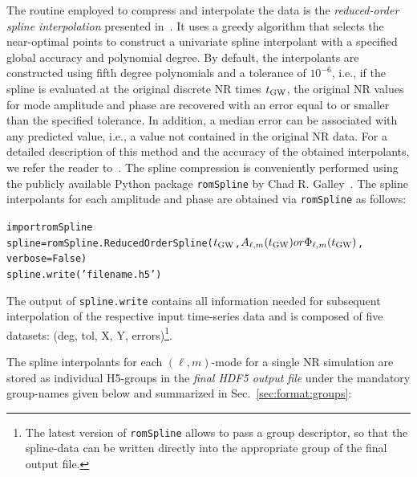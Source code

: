 \documentclass[11pt,tightenlines,article,amssymb,amsmath,amsfonts,superscriptaddress,nofootinbib]{revtex4}
\newcommand{\tGW}{t_{\rm GW}}
\begin{document}
The routine employed to compress and interpolate the data is the \emph{reduced-order spline interpolation} presented in~\cite{Galley:2016mvy}. It uses a greedy algorithm that selects the near-optimal points to construct a univariate spline interpolant with a specified global accuracy and polynomial degree.
By default, the interpolants are constructed using fifth degree polynomials and a tolerance of $10^{-6}$,
i.e., if the spline is evaluated at the original discrete NR times $\tGW$, the original NR values for mode amplitude and phase are recovered with an error equal to or smaller than the specified tolerance. In addition, a median error can be associated with any predicted value, i.e., a value not contained in the original NR data. 
For a detailed description of this method and the accuracy of the obtained interpolants, we refer the reader to~\cite{Galley:2016mvy}. The spline compression is conveniently performed using the publicly available Python package \texttt{romSpline} by Chad R. Galley~\cite{romspline}. The spline interpolants for each amplitude and phase are obtained via \verb"romSpline" as follows: 
\begin{alltt}
import romSpline 
spline = romSpline.ReducedOrderSpline(\(\tGW\), \(A\sb{\ell,m}(\tGW) or \Phi\sb{\ell,m}(\tGW)\), 
																		                                     verbose=False)
spline.write('filename.h5')
\end{alltt}
The output of \texttt{spline.write} contains all information needed for subsequent interpolation of the respective input time-series data and is composed of five datasets: (deg, tol, X, Y, errors)\footnote{The latest version of {\tt romSpline} allows to pass a group descriptor, so that the spline-data can be written directly into the appropriate group of the final output file.}.

The spline interpolants for each $(\ell,m)$-mode for a single NR
simulation are stored as individual H5-groups in the
\emph{final HDF5 output file} under the mandatory group-names given below and summarized in Sec.~\ref{sec:format:groups}:\\
\end{document}
